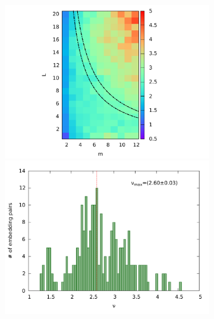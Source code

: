 \documentclass[a4paper,11pt,aps,secnumarabic,balancelastpage,amsmath,amssymb,floatfix,table]{article}
\begin{document}
\begin{figure}[H]
    \centering
    \begin{minipage}{.49\textwidth}
        \begin{subfigure}{\linewidth}
            \centering
            \includegraphics[width=\linewidth]
            {../4_blocks/4e4_points/plots/heatmap.pdf}\\
            \includegraphics[width=\linewidth]
            {../4_blocks/4e4_points/plots/histogram.pdf}
        \end{subfigure}
    \end{minipage}
    \begin{minipage}{.49\textwidth}
        \begin{subfigure}{\linewidth}

\end{subfigure}
\end{minipage}
\end{figure}
\end{document}
